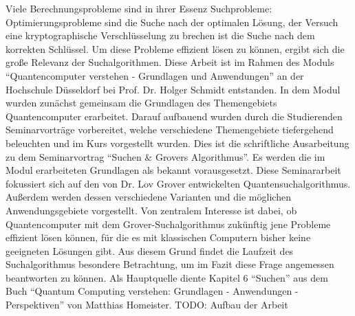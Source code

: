 Viele Berechnungsprobleme sind in ihrer Essenz Suchprobleme: Optimierungsprobleme sind die Suche nach der optimalen Lösung, der Versuch eine kryptographische Verschlüsselung zu brechen ist die Suche nach dem korrekten Schlüssel. Um diese Probleme effizient lösen zu können, ergibt sich die große Relevanz der Suchalgorithmen.
Diese Arbeit ist im Rahmen des Moduls “Quantencomputer verstehen - Grundlagen und Anwendungen” an der Hochschule Düsseldorf bei Prof. Dr. Holger Schmidt entstanden. In dem Modul wurden zunächst gemeinsam die Grundlagen des Themengebiets Quantencomputer erarbeitet. Darauf aufbauend wurden durch die Studierenden Seminarvorträge vorbereitet, welche verschiedene Themengebiete tiefergehend beleuchten und im Kurs vorgestellt wurden. Dies ist die schriftliche Ausarbeitung zu dem Seminarvortrag “Suchen \& Grovers Algorithmus”. Es werden die im Modul erarbeiteten Grundlagen als bekannt vorausgesetzt.
Diese Seminararbeit fokussiert sich auf den von Dr. Lov Grover entwickelten Quantensuchalgorithmus. Außerdem werden dessen verschiedene Varianten und die möglichen Anwendungsgebiete vorgestellt.
Von zentralem Interesse ist dabei, ob Quantencomputer mit dem Grover-Suchalgorithmus zukünftig jene Probleme effizient lösen können, für die es mit klassischen Computern bisher keine geeigneten Lösungen gibt. 
Aus diesem Grund findet die Laufzeit des Suchalgorithmus besondere Betrachtung, um im Fazit diese Frage angemessen beantworten zu können. 
Als Hauptquelle diente Kapitel 6 “Suchen” aus dem Buch “Quantum Computing verstehen: Grundlagen - Anwendungen - Perspektiven” von Matthias Homeister.
TODO: Aufbau der Arbeit